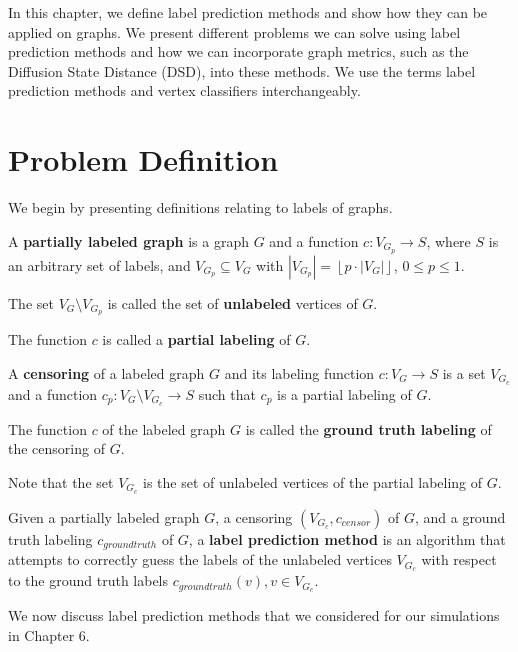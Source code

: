 In this chapter, we define label prediction methods and show how they can
be applied on graphs. We present different problems we can solve using
label prediction methods and how we can incorporate graph metrics, such as
the Diffusion State Distance (DSD), into these methods. We use the terms
label prediction methods and vertex classifiers interchangeably.

\section{Problem Definition}
\label{sec:label_prediction_methods}
We begin by presenting definitions relating to labels of graphs.

\begin{definition}
A \textbf{partially labeled graph} is a graph $G$ and a function
$c : V_{G_p} \to S$, where $S$ is an arbitrary set of labels, and
$V_{G_p} \subseteq V_G$ with
$|V_{G_p}| = \left\lfloor{p \cdot |V_G|}\right\rfloor$, $0 \leq p \leq 1$.

The set $V_G \setminus V_{G_p}$ is called the set of \textbf{unlabeled} 
vertices of $G$.

The function $c$ is called a \textbf{partial labeling} of $G$.
\end{definition}

\begin{definition}
A \textbf{censoring} of a labeled graph $G$ and its labeling function
$c : V_G \to S$ is a set $V_{G_c}$ and a function
$c_p: V_G \setminus V_{G_c} \to S$ such that $c_p$ is a partial labeling
of $G$.

The function $c$ of the labeled graph $G$ is called the
\textbf{ground truth labeling} of the censoring of $G$.

Note that the set $V_{G_c}$ is the set of unlabeled vertices of the
partial labeling of $G$.
\end{definition}

Given a partially labeled graph $G$, a censoring $(V_{G_c}, c_{censor})$
of $G$, and a ground truth labeling $c_{ground truth}$ of $G$, a 
\textbf{label prediction method} is an algorithm that attempts to correctly 
guess the labels of the unlabeled vertices $V_{G_c}$ with respect to the
ground truth labels $c_{ground truth}(v), v \in V_{G_c}$.

We now discuss label prediction methods that we considered for our 
simulations in Chapter 6.

